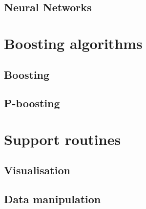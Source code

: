 \subsection{Neural Networks}

\section{Boosting algorithms}

\subsection{Boosting}

\subsection{P-boosting}

\section{Support routines}

\subsection{Visualisation}

\subsection{Data manipulation}

